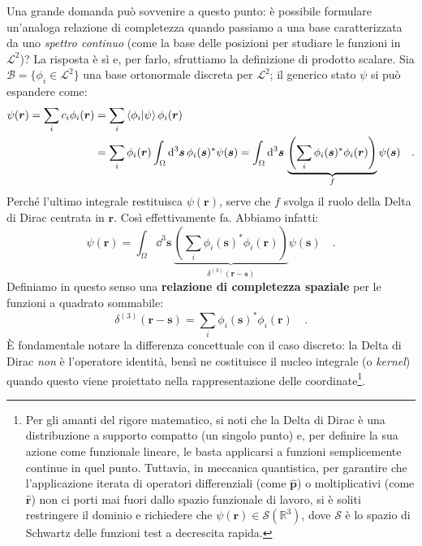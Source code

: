 Una grande domanda può sovvenire a questo punto: è possibile formulare un'analoga relazione di completezza quando passiamo a una base caratterizzata da uno \emph{spettro continuo} (come la base delle posizioni per studiare le funzioni in $\mathcal{L}^2$)? La risposta è sì e, per farlo, sfruttiamo la definizione di prodotto scalare. Sia $\mathcal{B} = \{ \phi_i \in \mathcal{L}^2 \}$ una base ortonormale discreta per $\mathcal{L}^2$; il generico stato $\psi$ si può espandere come:
\[
\begin{aligned}
    \psi(\bm{r}) = \sum_i c_i \phi_i(\bm{r}) &= \sum_i \bra{\phi_i}\ket{\psi} \phi_i(\bm{r}) \\
    &= \sum_i \phi_i(\bm{r}) \int_\Omega \dd^3{\bm{s}} \, \phi_i(\bm{s})^* \psi(\bm{s}) = \int_\Omega \dd^3{\bm{s}} \, \underbrace{\left(\sum_i  \phi_i(\bm{s})^* \phi_i(\bm{r})\right)}_{f} \psi(\bm{s}) \quad.
\end{aligned}
\]
Perché l'ultimo integrale restituisca $\psi(\bm{r})$, serve che $f$ svolga il ruolo della Delta di Dirac centrata in $\bm{r}$. Così effettivamente fa. Abbiamo infatti:
\[
    \psi(\bm{r}) = \int_\Omega \dd^3{\bm{s}} \, \underbrace{\left(\sum_i  \phi_i(\bm{s})^* \phi_i(\bm{r})\right)}_{\delta^{(3)}(\bm{r}-\bm{s})} \psi(\bm{s}) \quad.
\]
Definiamo in questo senso una \textbf{relazione di completezza spaziale} per le funzioni a quadrato sommabile:
\begin{equation}
    \delta^{(3)}(\bm{r}-\bm{s}) = \sum_i  \phi_i(\bm{s})^* \phi_i(\bm{r}) \quad.
    \label{eq:tua_equazione_sopra}
\end{equation}
È fondamentale notare la differenza concettuale con il caso discreto: la Delta di Dirac \emph{non} è l'operatore identità, bensì ne costituisce il nucleo integrale (o \emph{kernel}) quando questo viene proiettato nella rappresentazione delle coordinate\footnote{Per gli amanti del rigore matematico, si noti che la Delta di Dirac è una distribuzione a supporto compatto (un singolo punto) e, per definire la sua azione come funzionale lineare, le basta applicarsi a funzioni semplicemente continue in quel punto. Tuttavia, in meccanica quantistica, per garantire che l'applicazione iterata di operatori differenziali (come $\hat{\bm{p}}$) o moltiplicativi (come $\hat{\bm{r}}$) non ci porti mai fuori dallo spazio funzionale di lavoro, si è soliti restringere il dominio e richiedere che $\psi(\bm{r}) \in \mathcal{S}(\mathbb{R}^3)$, dove $\mathcal{S}$ è lo spazio di Schwartz delle funzioni test a decrescita rapida.}.

